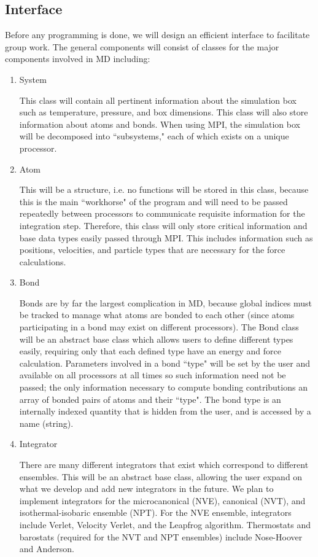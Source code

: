 \documentclass[10pt]{article}
\begin{document}
\subsection{Interface}
Before any programming is done, we will design an efficient interface to facilitate group work. The general components will consist of classes for the major components involved in MD including:
\begin{enumerate}
	\item{System} \par This class will contain all pertinent information about the simulation box such as temperature, pressure, and box dimensions.  This class will also store information about atoms and bonds.  When using MPI, the simulation box will be decomposed into ``subsystems," each of which exists on a unique processor. %
	\item{Atom} \par This will be a structure, i.e. no functions will be stored in this class, because this is the main ``workhorse" of the program and will need to be passed repeatedly between processors to communicate requisite information for the integration step.  Therefore, this class will only store critical information and base data types easily passed through MPI.  This includes information such as positions, velocities, and particle types that are necessary for the force calculations.
	\item{Bond} \par Bonds are by far the largest complication in MD, because global indices must be tracked to manage what atoms are bonded to each other (since atoms participating in a bond may exist on different processors).  The Bond class will be an abstract base class which allows users to define different types easily, requiring only that each defined type have an energy and force calculation.  Parameters involved in a bond ``type" will be set by the user and available on all processors at all times so such information need not be passed; the only information necessary to compute bonding contributions an array of bonded pairs of atoms and their ``type".  The bond type is an internally indexed quantity that is hidden from the user, and is accessed by a name (string).
	\item{Integrator} \par There are many different integrators that exist which correspond to different ensembles.  This will be an abstract base class, allowing the user expand on what we develop and add new integrators in the future.  We plan to implement integrators for the microcanonical  (NVE), canonical (NVT), and isothermal-isobaric ensemble (NPT).  For the NVE ensemble, integrators include Verlet, Velocity Verlet, and the Leapfrog algorithm.  Thermostats and barostats (required for the NVT and NPT ensembles) include Nose-Hoover and Anderson.

\end{enumerate}
\end{document}
